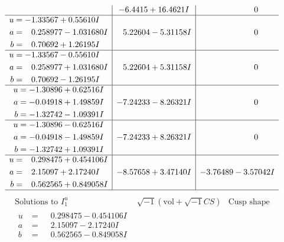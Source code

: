 \documentclass[1p]{elsarticle_modified}
\theoremstyle{definition}
\newcommand{\I}{\sqrt{-1}}
\begin{document}
$$\begin{array}{c|c|c}
 & -6.4415 + 16.4621 I & \phantom{-0.000000 } 0 \\ \hline\begin{aligned}
u &= -1.33567 + 0.55610 I \\
a &= \phantom{-}0.258977 - 1.031680 I \\
b &= \phantom{-}0.70692 + 1.26195 I\end{aligned}
 & \phantom{-}5.22604 - 5.31158 I & \phantom{-0.000000 } 0 \\ \hline\begin{aligned}
u &= -1.33567 - 0.55610 I \\
a &= \phantom{-}0.258977 + 1.031680 I \\
b &= \phantom{-}0.70692 - 1.26195 I\end{aligned}
 & \phantom{-}5.22604 + 5.31158 I & \phantom{-0.000000 } 0 \\ \hline\begin{aligned}
u &= -1.30896 + 0.62516 I \\
a &= -0.04918 + 1.49859 I \\
b &= -1.32742 - 1.09391 I\end{aligned}
 & -7.24233 - 8.26321 I & \phantom{-0.000000 } 0 \\ \hline\begin{aligned}
u &= -1.30896 - 0.62516 I \\
a &= -0.04918 - 1.49859 I \\
b &= -1.32742 + 1.09391 I\end{aligned}
 & -7.24233 + 8.26321 I & \phantom{-0.000000 } 0 \\ \hline\begin{aligned}
u &= \phantom{-}0.298475 + 0.454106 I \\
a &= \phantom{-}2.15097 + 2.17240 I \\
b &= \phantom{-}0.562565 + 0.849058 I\end{aligned}
 & -8.57658 + 3.47140 I & -3.76489 - 3.57042 I\\
 \hline 
 \end{array}$$\newpage$$\begin{array}{c|c|c}  
\text{Solutions to }I^u_{1}& \I (\text{vol} + \sqrt{-1}CS) & \text{Cusp shape}\\
 \hline 
\begin{aligned}
u &= \phantom{-}0.298475 - 0.454106 I \\
a &= \phantom{-}2.15097 - 2.17240 I \\
b &= \phantom{-}0.562565 - 0.849058 I\end{aligned}

\end{array}$$
\end{document}

